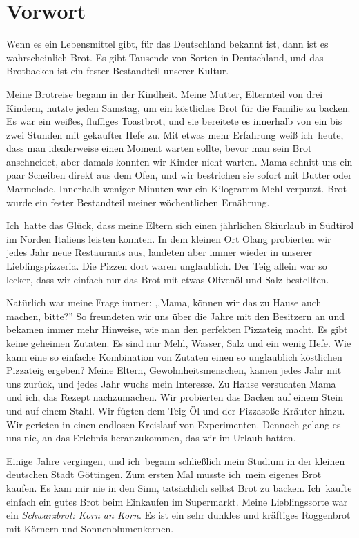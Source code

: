 \chapter{Vorwort}%
\label{ch:Preface}

Wenn es ein Lebensmittel gibt, für das Deutschland bekannt ist, dann ist es
wahrscheinlich Brot. Es gibt Tausende von Sorten in Deutschland, und das
Brotbacken ist ein fester Bestandteil unserer Kultur.

Meine Brotreise begann in der Kindheit. Meine Mutter, Elternteil von drei
Kindern, nutzte jeden Samstag, um ein köstliches Brot für die Familie zu
backen. Es war ein weißes, fluffiges Toastbrot, und sie bereitete es
innerhalb von ein bis zwei Stunden mit gekaufter Hefe zu. Mit etwas mehr
Erfahrung weiß ich~heute, dass man idealerweise einen Moment warten sollte,
bevor man sein Brot anschneidet, aber damals konnten wir Kinder nicht warten.
Mama schnitt uns ein paar Scheiben direkt aus dem Ofen, und wir bestrichen sie
sofort mit Butter oder Marmelade. Innerhalb weniger Minuten war ein Kilogramm
Mehl verputzt. Brot wurde ein fester Bestandteil meiner wöchentlichen
Ernährung.

Ich~hatte das Glück, dass meine Eltern sich einen jährlichen Skiurlaub in
Südtirol im Norden Italiens leisten konnten. In dem kleinen Ort Olang
probierten wir jedes Jahr neue Restaurants aus, landeten aber immer wieder
in unserer Lieblingspizzeria. Die Pizzen dort waren unglaublich. Der Teig
allein war so lecker, dass wir einfach nur das Brot mit etwas Olivenöl und
Salz bestellten.

Natürlich war meine Frage immer: ,,Mama, können wir das zu Hause auch machen,
bitte?'' So freundeten wir uns über die Jahre mit den Besitzern an und
bekamen immer mehr Hinweise, wie man den perfekten Pizzateig macht. Es gibt
keine geheimen Zutaten. Es sind nur Mehl, Wasser, Salz und ein wenig Hefe.
Wie kann eine so einfache Kombination von Zutaten einen so unglaublich
köstlichen Pizzateig ergeben? Meine Eltern, Gewohnheitsmenschen, kamen jedes
Jahr mit uns zurück, und jedes Jahr wuchs mein Interesse. Zu Hause versuchten
Mama und ich, das Rezept nachzumachen. Wir probierten das Backen auf einem
Stein und auf einem Stahl. Wir fügten dem Teig Öl und der Pizzasoße Kräuter
hinzu. Wir gerieten in einen endlosen Kreislauf von Experimenten. Dennoch
gelang es uns nie, an das Erlebnis heranzukommen, das wir im Urlaub hatten.

Einige Jahre vergingen, und ich~begann schließlich mein Studium in der kleinen
deutschen Stadt Göttingen. Zum ersten Mal musste ich~mein eigenes Brot kaufen.
Es kam mir nie in den Sinn, tatsächlich selbst Brot zu backen. Ich~kaufte
einfach ein gutes Brot beim Einkaufen im Supermarkt. Meine Lieblingssorte war
ein \emph{Schwarzbrot: Korn an Korn}. Es ist ein sehr dunkles und kräftiges
Roggenbrot mit Körnern und Sonnenblumenkernen.

